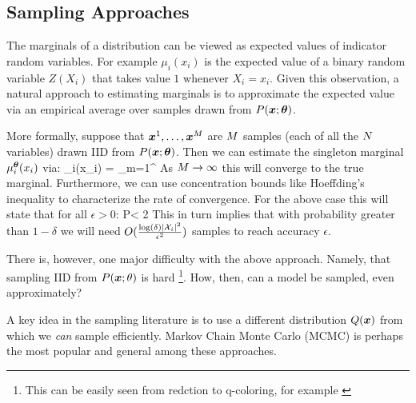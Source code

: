 \subsection{Sampling Approaches}
\label{sec:sampling}
The marginals of a distribution can be viewed as expected values of indicator random variables. For example $\mu_i(x_i)$ is the expected value of a binary
random variable $Z(X_i)$ that takes value $1$ whenever $X_i=x_i$. Given this observation, a natural approach to estimating marginals is to approximate the expected value via an empirical average over samples drawn from $P(\boldsymbol{x};\boldsymbol{\theta})$. 

More formally, suppose that $\boldsymbol{x}^{1},\ldots,\boldsymbol{x}^{M}$ are $M$ samples (each of all the $N$ variables) drawn IID from $P(\boldsymbol{x};\boldsymbol{\theta})$. Then we can estimate the singleton marginal $\mu^{\boldsymbol{\theta}}_i(x_i)$ via:
\be
\hat{\mu}_i(x_i) = \sum_{m=1}^{\nsamples} 
\ee
As $M \to \infty$ this will converge to the true marginal. Furthermore, we can use concentration bounds like Hoeffding's inequality to characterize the rate of convergence. For the above case this will state that for all $\epsilon > 0$:
\be
P < 2
\ee
This in turn implies that with probability greater than $1-\delta$ we will need $O(\frac{\log(\delta) |{\cal X}_i|^2}{\epsilon^2})$ samples to reach accuracy $\epsilon$.

There is, however, one major difficulty with the above approach.
Namely, that sampling IID from $P(\boldsymbol{x};\theta)$ is hard \footnote{This can be easily seen from redction to q-coloring, for example \cite{levin2009markov, bordewich2016mixing}}.
How, then, can a model be sampled, even approximately?

A key idea in the sampling literature is to use a different distribution $Q(\boldsymbol{x})$ from which we {\em can} sample efficiently. 
Markov Chain Monte Carlo (MCMC) is perhaps the most popular and general among these approaches\cite{andrieu2003introduction,levin2009markov}.

